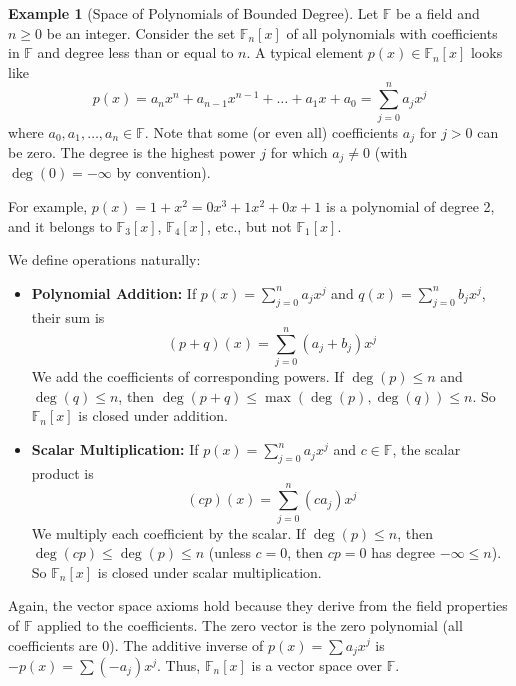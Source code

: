 \documentclass[11pt]{article}
\theoremstyle{definition}
\newtheorem{example}[theorem]{Example}
\newcommand{\F}{\mathbb{F}}
\newcommand{\Fn}[1]{\mathbb{F}_{#1}[x]}
\begin{document}
\begin{example}[Space of Polynomials of Bounded Degree]
Let $\F$ be a field and $n \ge 0$ be an integer. Consider the set $\Fn{n}$ of all polynomials with coefficients in $\F$ and degree less than or equal to $n$. A typical element $p(x) \in \Fn{n}$ looks like
\[ p(x) = a_n x^n + a_{n-1} x^{n-1} + \dots + a_1 x + a_0 = \sum_{j=0}^n a_j x^j \]
where $a_0, a_1, \dots, a_n \in \F$. Note that some (or even all) coefficients $a_j$ for $j>0$ can be zero. The degree is the highest power $j$ for which $a_j \neq 0$ (with $\deg(0) = -\infty$ by convention).

For example, $p(x) = 1 + x^2 = 0x^3 + 1x^2 + 0x + 1$ is a polynomial of degree 2, and it belongs to $\mathbb{F}_3[x]$, $\mathbb{F}_4[x]$, etc., but not $\mathbb{F}_1[x]$.

We define operations naturally:
\begin{itemize}
    \item \textbf{Polynomial Addition:} If $p(x) = \sum_{j=0}^n a_j x^j$ and $q(x) = \sum_{j=0}^n b_j x^j$, their sum is
    \[ (p+q)(x) = \sum_{j=0}^n (a_j + b_j) x^j \]
    We add the coefficients of corresponding powers. If $\deg(p) \le n$ and $\deg(q) \le n$, then $\deg(p+q) \le \max(\deg(p), \deg(q)) \le n$. So $\Fn{n}$ is closed under addition.
    \item \textbf{Scalar Multiplication:} If $p(x) = \sum_{j=0}^n a_j x^j$ and $c \in \F$, the scalar product is
    \[ (c p)(x) = \sum_{j=0}^n (c a_j) x^j \]
    We multiply each coefficient by the scalar. If $\deg(p) \le n$, then $\deg(cp) \le \deg(p) \le n$ (unless $c=0$, then $cp=0$ has degree $-\infty \le n$). So $\Fn{n}$ is closed under scalar multiplication.
\end{itemize}
Again, the vector space axioms hold because they derive from the field properties of $\F$ applied to the coefficients. The zero vector is the zero polynomial (all coefficients are $0$). The additive inverse of $p(x) = \sum a_j x^j$ is $-p(x) = \sum (-a_j) x^j$. Thus, $\Fn{n}$ is a vector space over $\F$.
\end{example}
\end{document}
